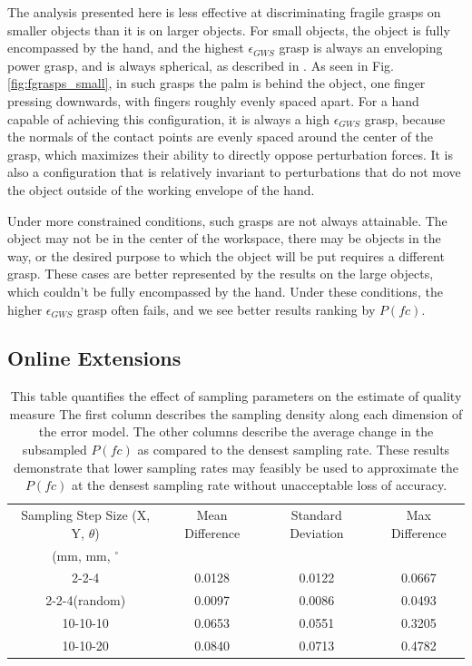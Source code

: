 The analysis presented here is less effective at discriminating fragile grasps on smaller objects than it is on larger objects. For small objects, the object is fully encompassed by the hand, and the highest $\epsilon_{GWS}$ grasp is always an enveloping power grasp, and is always spherical, as described in \cite{Cutkoskytaxonomy}. As seen in Fig. \ref{fig:fgrasps_small}, in such grasps the palm is behind the object, one finger pressing downwards, with fingers roughly evenly spaced apart. For a hand capable of achieving this configuration, it is always a high $\epsilon_{GWS}$ grasp, because the normals of the contact points are evenly spaced around the center of the grasp, which maximizes their ability to directly oppose perturbation forces. It is also a configuration that is relatively invariant to perturbations that do not move the object outside of the working envelope of the hand. 

Under more constrained conditions, such grasps are not always attainable. The object may not be in the center of the workspace, there may be objects in the way, or the desired purpose to which the object will be put requires a different grasp. These cases are better represented by the results on the large objects, which couldn't be fully encompassed by the hand. Under these conditions, the higher $\epsilon_{GWS}$ grasp often fails, and we see better results ranking by $P(fc)$.

\subsection{Online Extensions}

\begin{table}
\centering
\begin{tabular}{ |c |c | c | c | }
\hline
Sampling Step Size (X, Y, $\theta$) & Mean Difference & Standard Deviation & Max Difference \\ 
 (mm, mm, $^{\circ}$ &  & &\\ \hline
2-2-4 & 0.0128 & 0.0122 & 0.0667 \\ \hline
2-2-4(random) & 0.0097 & 0.0086 & 0.0493  \\ \hline
10-10-10 & 0.0653 & 0.0551 & 0.3205  \\ \hline
10-10-20 & 0.0840 & 0.0713 &0.4782 \\ \hline
\end{tabular}
\caption{This table quantifies the effect of sampling parameters on the estimate of quality measure
The first column describes the sampling density along each dimension of the error model. The other columns describe the average change in the subsampled $P(fc)$ as compared to the densest sampling rate. These results demonstrate that lower sampling rates may feasibly be used to approximate the $P(fc)$ at the densest sampling rate without unacceptable loss of accuracy.}
\label{tab:expresultbrief2}
\end{table}


